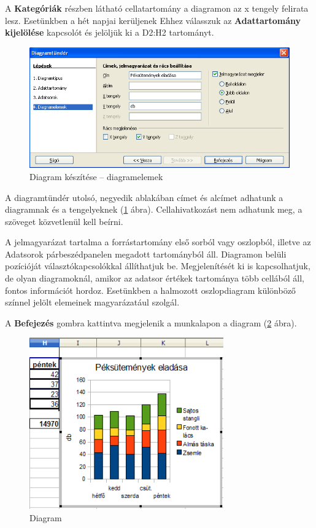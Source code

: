 A \textbf{Kategóriák} részben látható cellatartomány a
diagramon az x tengely felirata lesz. Esetünkben a hét napjai
kerüljenek Ehhez válasszuk az \textbf{Adattartomány
kijelölése} kapcsolót és jelöljük ki a D2:H2 tartományt.

\begin{figure}[!h]
\begin{center}
\includegraphics[width=15.499cm]{oocalcv1-img56.png}
\caption{Diagram készítése --  diagramelemek}\label{DiagramElemek}
\end{center}
\end{figure}

A diagramtündér utolsó, negyedik ablakában címet és
alcímet adhatunk a diagramnak és a tengelyeknek (\ref{DiagramElemek} ábra).
Cellahivatkozást nem adhatunk meg, a szöveget közvetlenül kell
beírni.

A jelmagyarázat tartalma a forrástartomány első sorból vagy
oszlopból, illetve az Adatsorok párbeszédpanelen megadott
tartományból áll. Diagramon belüli pozícióját
választókapcsolókkal állíthatjuk be. Megjelenítését ki
is kapcsolhatjuk, de olyan diagramoknál, amikor az adatsor
értékek tartománya több cellából áll, fontos
információt hordoz. Esetünkben a halmozott oszlopdiagram
különböző színnel jelölt elemeinek magyarázatául
szolgál.

A \textbf{Befejezés} gombra kattintva megjelenik a munkalapon a
diagram (\ref{Diagram} ábra). 

\begin{figure}[!h]
\begin{center}
\includegraphics[width=8.364cm]{oocalcv1-img57.png}
\caption{Diagram}\label{Diagram}
\end{center}
\end{figure}

